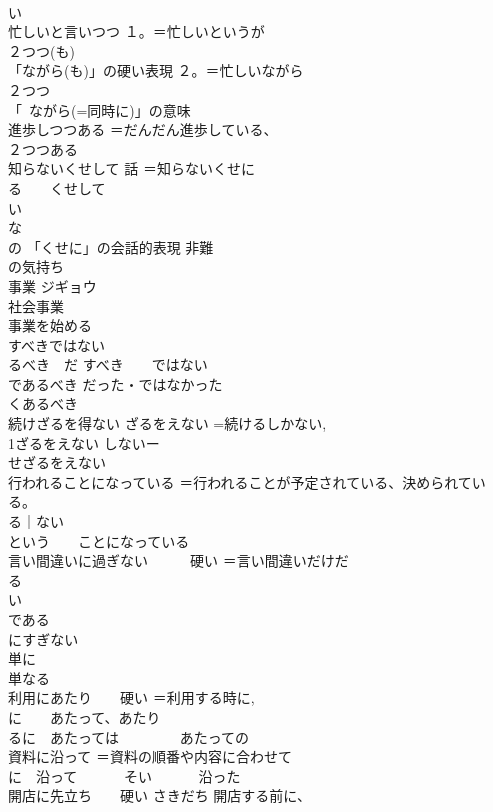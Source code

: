 \documentclass[8pt]{extreport}
\begin{document}
\begin{CJK}{UTF8}{min}
\\	い 
\\	忙しいと言いつつ	１。＝忙しいというが 
\\	２つつ(も)
\\	「ながら(も)」の硬い表現 ２。＝忙しいながら 
\\	２つつ
\\	「~ながら(=同時に)」の意味
\\	進歩しつつある	＝だんだん進歩している、
\\	２つつある
\\	知らないくせして	話 ＝知らないくせに 
\\	る　　くせして 
\\	い 
\\	な 
\\	の 「くせに」の会話的表現 非難
\\	の気持ち
\\	事業	ジギョウ 
\\	社会事業 
\\	事業を始める 
\\	すべきではない	
\\	るべき　だ すべき　　ではない 
\\	であるべき だった・ではなかった 
\\	くあるべき　
\\	続けざるを得ない	ざるをえない =続けるしかない, 
\\	1ざるをえない しないー
\\	せざるをえない
\\	行われることになっている	＝行われることが予定されている、決められている。 
\\	る｜ない 
\\	という　　ことになっている
\\	言い間違いに過ぎない　　　硬い	＝言い間違いだけだ 
\\	る
\\	い
\\	である
\\	にすぎない
\\	単に 
\\	単なる	
\\	利用にあたり　　硬い	＝利用する時に, 
\\	に　　あたって、あたり 
\\	るに　あたっては 　　　　あたっての
\\	資料に沿って	＝資料の順番や内容に合わせて 
\\	に　沿って 　　　そい 　　　沿った
\\	開店に先立ち　　硬い	さきだち 開店する前に、

\end{CJK}
\end{document}
